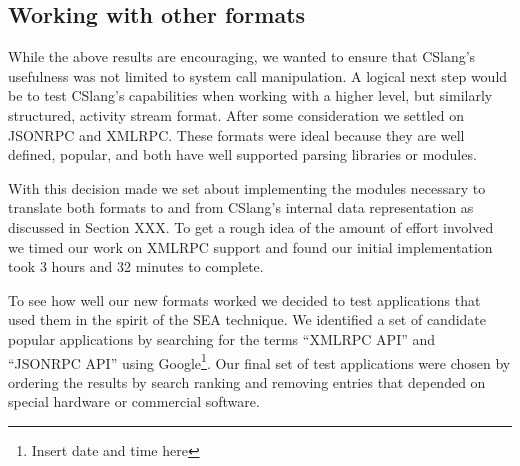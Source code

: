 \subsection{Working with other formats}

While the above results are encouraging, we wanted to ensure that CSlang's
usefulness was not limited to system call manipulation.
A logical next step would be to test CSlang's capabilities when working
with a higher level, but similarly structured, activity stream format.
After some consideration we settled on JSONRPC and XMLRPC.  These formats
were ideal because they are well defined, popular, and both have well
supported parsing libraries or modules.

With this decision made we set about implementing the modules necessary
to translate
both formats to and from CSlang's internal data representation as
discussed in Section XXX.  To get a rough idea of the amount of effort
involved we timed our work on XMLRPC support and found our initial
implementation took 3 hours and 32 minutes to complete.

To see how well our new formats worked we decided to test applications that
used them in the spirit of the SEA technique.  We identified a set of
candidate popular applications by searching for the terms ``XMLRPC API''
and ``JSONRPC API'' using Google\footnote{Insert date and time here}.  Our
final set of test applications were chosen by ordering the results by search
ranking and removing entries that depended on special hardware or
commercial software.







